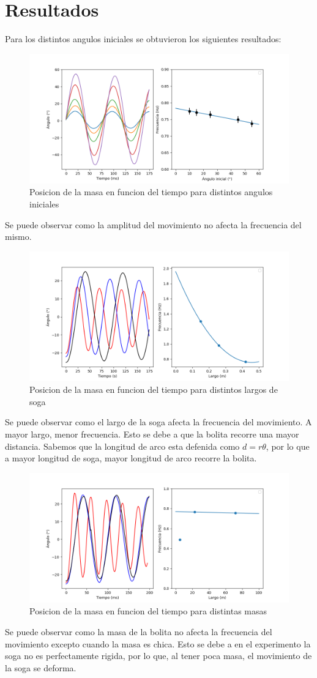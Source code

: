 \documentclass[12pt,a4]{article}
\begin{document}
\section{Resultados}

Para los distintos angulos iniciales se obtuvieron los siguientes resultados:

\begin{figure}[H]
    \centering
    \includegraphics[width=0.6\linewidth]{angulos.png}
    \caption{Posicion de la masa en funcion del tiempo para distintos angulos iniciales}
    \label{fig:angulos}
\end{figure}

Se puede observar como la amplitud del movimiento no afecta la frecuencia del mismo. 

\begin{figure}[H]
    \centering
    \includegraphics[width=0.6\linewidth]{largo.png}
    \caption{Posicion de la masa en funcion del tiempo para distintos largos de soga}
    \label{fig:largo}
\end{figure}

Se puede observar como el largo de la soga afecta la frecuencia del movimiento. A mayor largo, menor frecuencia. Esto se debe a que la bolita recorre una mayor distancia. Sabemos que la longitud de arco esta defenida como $d = r \theta$, por lo que a mayor longitud de soga, mayor longitud de arco recorre la bolita.

\begin{figure}[H]
    \centering
    \includegraphics[width=0.6\linewidth]{peso.png}
    \caption{Posicion de la masa en funcion del tiempo para distintas masas}
    \label{fig:masa}
\end{figure}

Se puede observar como la masa de la bolita no afecta la frecuencia del movimiento excepto cuando la masa es chica. Esto se debe a en el experimento la soga no es perfectamente rigida, por lo que, al tener poca masa, el movimiento de la soga se deforma.
\end{document}
